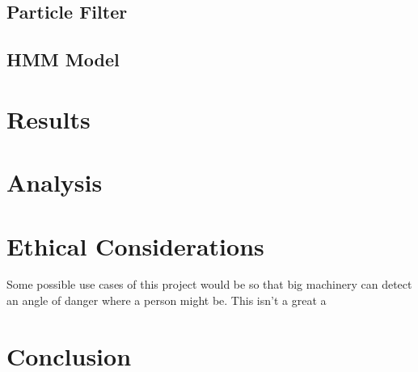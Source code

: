 \documentclass[11pt]{amsart}
\begin{document}
\subsection{Particle Filter}

\subsection{HMM Model}

\section{Results}

\section{Analysis}

\section{Ethical Considerations}
Some possible use cases of this project would be so that big machinery can detect an angle of danger where a person might be. 
This isn't a great a 

\section{Conclusion}
\end{document}
